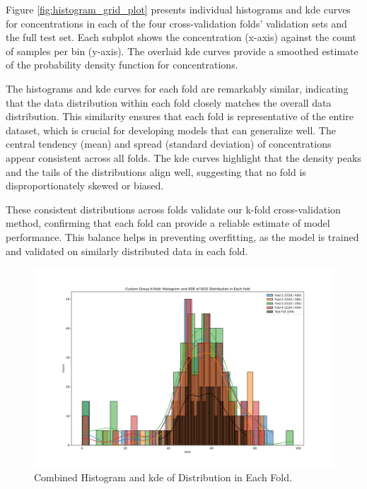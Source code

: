 Figure \ref{fig:histogram_grid_plot} presents individual histograms and \gls{kde} curves for  concentrations in each of the four cross-validation folds' validation sets and the full test set.
Each subplot shows the  concentration (x-axis) against the count of samples per bin (y-axis).
The overlaid \gls{kde} curves provide a smoothed estimate of the probability density function for  concentrations.

The histograms and \gls{kde} curves for each fold are remarkably similar, indicating that the data distribution within each fold closely matches the overall data distribution.
This similarity ensures that each fold is representative of the entire dataset, which is crucial for developing models that can generalize well.
The central tendency (mean) and spread (standard deviation) of  concentrations appear consistent across all folds.
The \gls{kde} curves highlight that the density peaks and the tails of the distributions align well, suggesting that no fold is disproportionately skewed or biased.

These consistent distributions across folds validate our k-fold cross-validation method, confirming that each fold can provide a reliable estimate of model performance.
This balance helps in preventing overfitting, as the model is trained and validated on similarly distributed data in each fold.

\begin{figure}[h!]
    \centering
    \includegraphics[width=\textwidth]{images/histogram_kde_plot.png}
    \caption{Combined Histogram and \gls{kde} of  Distribution in Each Fold.}
    \label{fig:histogram_kde_plot}
\end{figure}

